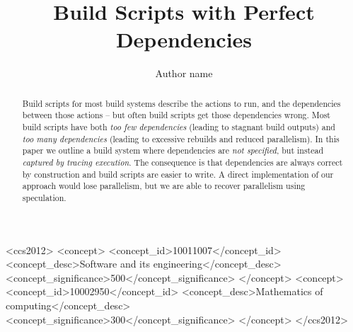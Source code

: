 \documentclass[acmsmall]{acmart}
\begin{document}
\newcommand{\Make}{\textsc{Make}\xspace}
\newcommand{\Rattle}{\textsc{Rattle}\xspace}
\newcommand{\Fabricate}{\textsc{Fabricate}\xspace}
\newcommand{\Bazel}{\textsc{Bazel}\xspace}
\newcommand{\Buck}{\textsc{Buck}\xspace}
\newcommand{\Shake}{\textsc{Shake}\xspace}
\newcommand{\Bigbro}{\textsc{BigBro}\xspace}
\newcommand{\Fac}{\textsc{Fac}\xspace}
\newcommand{\Fsatrace}{\textsc{Fsatrace}\xspace}
\newcommand{\tracedfs}{\textsc{Traced-Fs}\xspace}
\newcommand{\BuildXL}{\textsc{BuildXL}\xspace}
\newcommand{\Nix}{\textsc{Nix}\xspace}
\newcommand{\Memoize}{\textsc{Memoize}\xspace}
\newcommand{\Stroll}{\textsc{Stroll}\xspace}

\newcommand{\postparagraphs}{\vspace{3mm}\noindent}


\title{Build Scripts with Perfect Dependencies}

\author{Author name}


\begin{abstract}
Build scripts for most build systems describe the actions to run, and the dependencies between those actions -- but often build scripts get those dependencies wrong.
Most build scripts have both \emph{too few dependencies} (leading to stagnant build outputs) and \emph{too many dependencies} (leading to excessive rebuilds and reduced parallelism).
In this paper we outline a build system where dependencies are \emph{not specified}, but instead \emph{captured by tracing execution}.
The consequence is that dependencies are always correct by construction and build scripts are easier to write.
A direct implementation of our approach would lose parallelism, but we are able to recover parallelism using speculation.
\end{abstract}

\begin{CCSXML}
<ccs2012>
<concept>
<concept_id>10011007</concept_id>
 <concept_desc>Software and its engineering</concept_desc>
<concept_significance>500</concept_significance>
</concept>
<concept>
<concept_id>10002950</concept_id>
 <concept_desc>Mathematics of computing</concept_desc>
<concept_significance>300</concept_significance>
</concept>
</ccs2012>
\end{CCSXML}

\maketitle










\end{document}
